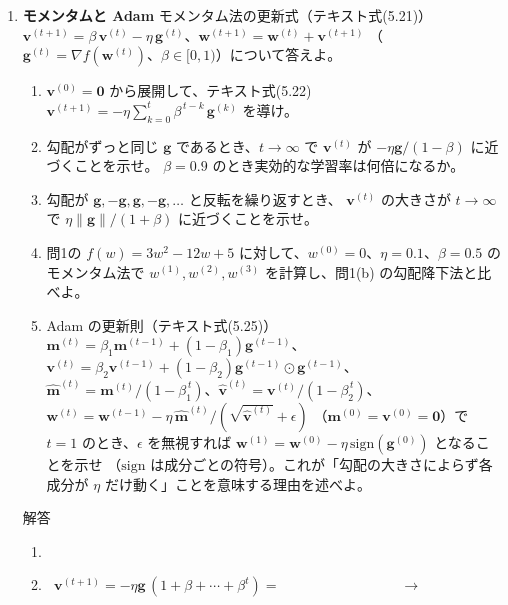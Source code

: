\documentclass[a4paper,dvipdfmx]{jsarticle}
\newcommand{\提出期限}{2026年10月26日（月）}
\newcommand{\学籍番号}{0000000}
\newcommand{\氏名}{氏名を書く}
\newcommand{\提出日}{2026年10月26日}
\newenvironment{answer}{\begin{itembox}[l]{解答}}{\end{itembox}}
\begin{document}
\begin{enumerate}
  \item \textbf{モメンタムと Adam}\quad
    モメンタム法の更新式（テキスト式(5.21)）
    $\bm{v}^{(t+1)} = \beta\,\bm{v}^{(t)} - \eta\,\bm{g}^{(t)}$、$\bm{w}^{(t+1)} = \bm{w}^{(t)} + \bm{v}^{(t+1)}$
    （$\bm{g}^{(t)} = \nabla f(\bm{w}^{(t)})$、$\beta \in [0, 1)$）について答えよ。
    \begin{enumerate}
      \item $\bm{v}^{(0)} = \bm{0}$ から展開して、テキスト式(5.22) $\bm{v}^{(t+1)} = -\eta \sum_{k=0}^{t} \beta^{\,t-k}\,\bm{g}^{(k)}$ を導け。
      \item 勾配がずっと同じ $\bm{g}$ であるとき、$t \to \infty$ で $\bm{v}^{(t)}$ が $-\eta\bm{g}/(1 - \beta)$ に近づくことを示せ。
        $\beta = 0.9$ のとき実効的な学習率は何倍になるか。
      \item 勾配が $\bm{g}, -\bm{g}, \bm{g}, -\bm{g}, \ldots$ と反転を繰り返すとき、
        $\bm{v}^{(t)}$ の大きさが $t \to \infty$ で $\eta\|\bm{g}\|/(1 + \beta)$ に近づくことを示せ。
      \item 問1の $f(w) = 3w^2 - 12w + 5$ に対して、$w^{(0)} = 0$、$\eta = 0.1$、$\beta = 0.5$ の
        モメンタム法で $w^{(1)}, w^{(2)}, w^{(3)}$ を計算し、問1(b) の勾配降下法と比べよ。
      \item Adam の更新則（テキスト式(5.25)）
        $\bm{m}^{(t)} = \beta_1\bm{m}^{(t-1)} + (1 - \beta_1)\bm{g}^{(t-1)}$、
        $\bm{v}^{(t)} = \beta_2\bm{v}^{(t-1)} + (1 - \beta_2)\bm{g}^{(t-1)} \odot \bm{g}^{(t-1)}$、
        $\hat{\bm{m}}^{(t)} = \bm{m}^{(t)}/(1 - \beta_1^{\,t})$、$\hat{\bm{v}}^{(t)} = \bm{v}^{(t)}/(1 - \beta_2^{\,t})$、
        $\bm{w}^{(t)} = \bm{w}^{(t-1)} - \eta\,\hat{\bm{m}}^{(t)}/(\sqrt{\hat{\bm{v}}^{(t)}} + \epsilon)$
        （$\bm{m}^{(0)} = \bm{v}^{(0)} = \bm{0}$）で $t = 1$ のとき、$\epsilon$ を無視すれば
        $\bm{w}^{(1)} = \bm{w}^{(0)} - \eta\,\mathrm{sign}(\bm{g}^{(0)})$ となることを示せ
        （$\mathrm{sign}$ は成分ごとの符号）。これが「勾配の大きさによらず各成分が $\eta$ だけ動く」ことを意味する理由を述べよ。
    \end{enumerate}
    \begin{answer}
      \begin{enumerate}
        \item \mbox{}
          \vspace{22mm}
        \item
          \begin{equation*}
            \bm{v}^{(t+1)} = -\eta\bm{g}\,(1 + \beta + \cdots + \beta^t) = \phantom{XXXXXXXXXX} \;\longrightarrow\; \phantom{XXXXXX}

\end{equation*}
\end{enumerate}
\end{answer}
\end{enumerate}
\end{document}
